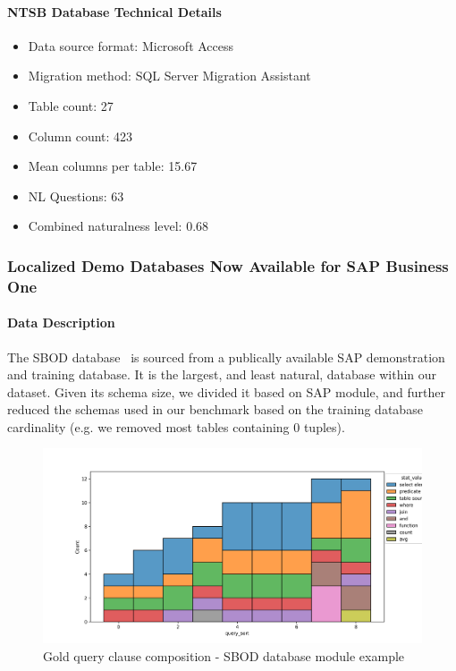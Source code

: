 \paragraph{NTSB Database Technical Details}
\begin{itemize}
  \item Data source format: Microsoft Access
  \item Migration method: SQL Server Migration Assistant
  \item Table count: 27
  \item Column count: 423
  \item Mean columns per table: 15.67
  \item NL Questions: 63
  \item Combined naturalness level: 0.68 
\end{itemize}

\subsubsection{Localized Demo Databases Now Available for SAP Business One}

\paragraph{Data Description}
The SBOD database~\cite{sap-demo} is sourced from a publically available SAP demonstration and training database.
It is the largest, and least natural, database within our dataset.
Given its schema size, we divided it based on SAP module, and further reduced the schemas used in our benchmark based on the training database cardinality (e.g. we removed most tables containing 0 tuples).


\begin{figure}[H]
  \centering
  \includegraphics[width=\linewidth]{figures/query-stats/SBODemoUS-stats-clause-counts.png}
  \caption{Gold query clause composition - SBOD database module example}
  \label{fig:query-complexity-sbod}
\end{figure}

